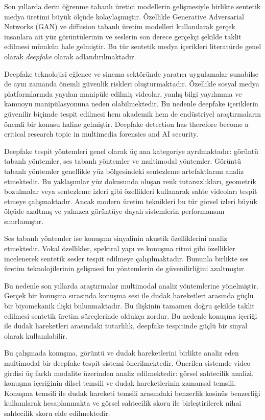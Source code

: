 \documentclass[conference]{IEEEtran}
\begin{document}
Son yıllarda derin öğrenme tabanlı üretici modellerin gelişmesiyle birlikte sentetik medya üretimi büyük ölçüde kolaylaşmıştır. Özellikle Generative Adversarial Networks (GAN) ve diffusion tabanlı üretim modelleri kullanılarak gerçek insanlara ait yüz görüntülerinin ve seslerin son derece gerçekçi şekilde taklit edilmesi mümkün hale gelmiştir. Bu tür sentetik medya içerikleri literatürde genel olarak \textit{deepfake} olarak adlandırılmaktadır.

Deepfake teknolojisi eğlence ve sinema sektöründe yaratıcı uygulamalar sunabilse de aynı zamanda önemli güvenlik riskleri oluşturmaktadır. Özellikle sosyal medya platformlarında yayılan manipüle edilmiş videolar, yanlış bilgi yayılımına ve kamuoyu manipülasyonuna neden olabilmektedir. Bu nedenle deepfake içeriklerin güvenilir biçimde tespit edilmesi hem akademik hem de endüstriyel araştırmaların önemli bir konusu haline gelmiştir. Deepfake detection has therefore become a critical research topic in multimedia forensics and AI security.

Deepfake tespit yöntemleri genel olarak üç ana kategoriye ayrılmaktadır: görüntü tabanlı yöntemler, ses tabanlı yöntemler ve multimodal yöntemler. Görüntü tabanlı yöntemler genellikle yüz bölgesindeki sentezleme artefaktlarını analiz etmektedir. Bu yaklaşımlar yüz dokusunda oluşan renk tutarsızlıkları, geometrik bozulmalar veya sentezleme izleri gibi özellikleri kullanarak sahte videoları tespit etmeye çalışmaktadır. Ancak modern üretim teknikleri bu tür görsel izleri büyük ölçüde azaltmış ve yalnızca görüntüye dayalı sistemlerin performansını sınırlamıştır.

Ses tabanlı yöntemler ise konuşma sinyalinin akustik özelliklerini analiz etmektedir. Vokal özellikler, spektral yapı ve konuşma ritmi gibi özellikler incelenerek sentetik sesler tespit edilmeye çalışılmaktadır. Bununla birlikte ses üretim teknolojilerinin gelişmesi bu yöntemlerin de güvenilirliğini azaltmıştır.

Bu nedenle son yıllarda araştırmalar multimodal analiz yöntemlerine yönelmiştir. Gerçek bir konuşma sırasında konuşma sesi ile dudak hareketleri arasında güçlü bir biyomekanik ilişki bulunmaktadır. Bu ilişkinin tamamen doğru şekilde taklit edilmesi sentetik üretim süreçlerinde oldukça zordur. Bu nedenle konuşma içeriği ile dudak hareketleri arasındaki tutarlılık, deepfake tespitinde güçlü bir sinyal olarak kullanılabilir.

Bu çalışmada konuşma, görüntü ve dudak hareketlerini birlikte analiz eden multimodal bir deepfake tespit sistemi önerilmektedir. Önerilen sistemde video girdisi üç farklı modalite üzerinden analiz edilmektedir: görsel sahtecilik analizi, konuşma içeriğinin dilsel temsili ve dudak hareketlerinin zamansal temsili. Konuşma temsili ile dudak hareketi temsili arasındaki benzerlik kosinüs benzerliği kullanılarak hesaplanmakta ve görsel sahtecilik skoru ile birleştirilerek nihai sahtecilik skoru elde edilmektedir.
\end{document}
